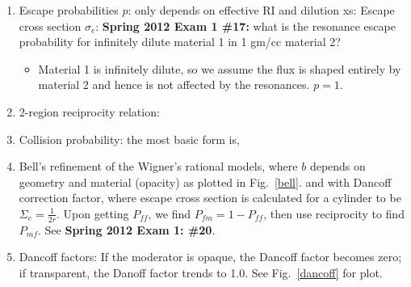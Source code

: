 \documentclass{school-22.211-notes}
\begin{document}
\begin{enumerate}
\begin{enumerate}
    \item Escape probabilities $p$: only depends on effective RI and dilution xs: 
      Escape cross section $\sigma_e$: 
      \textbf{Spring 2012 Exam 1 \#17:} what is the resonance escape probability for infinitely dilute material 1 in 1 gm/cc material 2? 
      \begin{itemize}
        \item Material 1 is infinitely dilute, so we assume the flux is shaped entirely by material 2 and hence is not affected by the resonances. $p = 1$. 
      \end{itemize}

    \item 2-region reciprocity relation:

    \item Collision probability: the most basic form is, 

    \item Bell's refinement of the Wigner's rational models, where $b$ depends on geometry and material (opacity) as plotted in Fig.~\ref{bell}.
      and with Dancoff correction factor, 
      where escape cross section is calculated for a cylinder to be $\Sigma_e = \frac{1}{2r}$.  Upon getting $P_{ff}$, we find $P_{fm} = 1 - P_{ff}$, then use reciprocity to find $P_{mf}$. See \textbf{Spring 2012 Exam 1: \#20}. 

    \item Dancoff factors: If the moderator is opaque, the Dancoff factor becomes zero; if transparent, the Danoff factor trends to 1.0. See Fig.~\ref{dancoff} for plot. 


\end{enumerate}
\end{enumerate}
\end{document}
